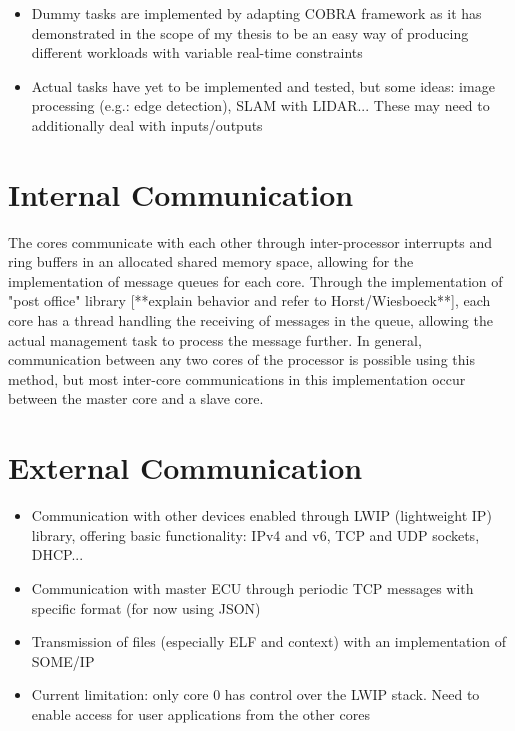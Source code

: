 \begin{itemize}
	\item Dummy tasks are implemented by adapting COBRA framework as it has demonstrated in the scope of my thesis to be an easy way of producing different workloads with variable real-time constraints
	\item Actual tasks have yet to be implemented and tested, but some ideas: image processing (e.g.: edge detection), SLAM with LIDAR... These may need to additionally deal with inputs/outputs
\end{itemize}



\section{Internal Communication}
The cores communicate with each other through inter-processor interrupts and ring buffers in an allocated shared memory space, allowing for the implementation of message queues for each core. Through the implementation of "post office" library [**explain behavior and refer to Horst/Wiesboeck**], each core has a thread handling the receiving of messages in the queue, allowing the actual management task to process the message further. In general, communication between any two cores of the processor is possible using this method, but most inter-core communications in this implementation occur between the master core and a slave core.



\section{External Communication}
\begin{itemize}
	\item Communication with other devices enabled through LWIP (lightweight IP) library, offering basic functionality: IPv4 and v6, TCP and UDP sockets, DHCP...
	\item Communication with master ECU through periodic TCP messages with specific format (for now using JSON)
	\item Transmission of files (especially ELF and context) with an implementation of SOME/IP
	\item Current limitation: only core 0 has control over the LWIP stack. Need to enable access for user applications from the other cores
\end{itemize}


